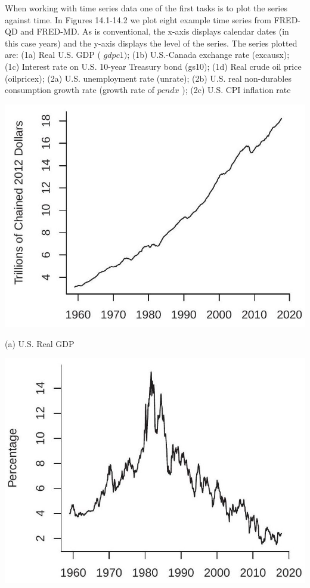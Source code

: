 \documentclass[10pt]{article}
\begin{document}
When working with time series data one of the first tasks is to plot the series against time. In Figures 14.1-14.2 we plot eight example time series from FRED-QD and FRED-MD. As is conventional, the x-axis displays calendar dates (in this case years) and the y-axis displays the level of the series. The series plotted are: (1a) Real U.S. GDP ( $g d p c 1)$; (1b) U.S.-Canada exchange rate (excausx); (1c) Interest rate on U.S. 10-year Treasury bond (gs10); (1d) Real crude oil price (oilpricex); (2a) U.S. unemployment rate (unrate); (2b) U.S. real non-durables consumption growth rate (growth rate of $p c n d x$ ); (2c) U.S. CPI inflation rate

\includegraphics[max width=\textwidth]{2022_10_23_6047885e7d154c9f28afg-02}

(a) U.S. Real GDP

\includegraphics[max width=\textwidth]{2022_10_23_6047885e7d154c9f28afg-02(1)}
\end{document}
